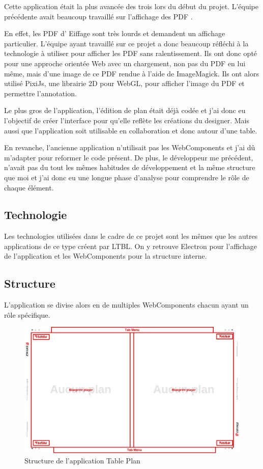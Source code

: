 Cette application était la plus avancée des trois lors du début du projet.
L'équipe précédente avait beaucoup travaillé sur l'affichage des PDF .

En effet, les PDF d’ Eiffage sont très lourds et demandent un affichage particulier.
L'équipe ayant travaillé sur ce projet a donc beaucoup réfléchi à la technologie à utiliser pour afficher les PDF sans ralentissement.
Ils ont donc opté pour une approche orientée Web avec un chargement, non pas du PDF en lui même, mais d'une image de ce PDF rendue à l'aide de ImageMagick.
Ils ont alors utilisé PixiJs, une librairie 2D pour WebGL, pour afficher l'image du PDF et permettre l'annotation.

Le plus gros de l'application, l'édition de plan était déjà codée et j'ai donc eu l'objectif de créer l'interface pour qu'elle reflète les créations du designer.
Mais aussi que l'application soit utilisable en collaboration et donc autour d'une table.

En revanche, l'ancienne application n'utilisait pas les WebComponents et j'ai dû m'adapter pour reformer le code présent.
De plus, le développeur me précédent, n'avait pas du tout les mêmes habitudes de développement et la même structure que moi et j'ai donc eu une longue phase d'analyse pour comprendre le rôle de chaque élément.

\subsection{Technologie}
\label{eiffageTablePlanTechnologie}

Les technologies utilisées dans le cadre de ce projet sont les mêmes que les autres applications de ce type créent par LTBL.
On y retrouve Electron pour l'affichage de l'application et les WebComponents pour la structure interne.

\subsection{Structure}
\label{eiffageTablePlanStructure}

L'application se divise alors en de multiples WebComponents chacun ayant un rôle spécifique.

\begin{figure}[h]
    \centering
    \includegraphics[scale=0.5]{img/table-plan-structure.pdf}
    \caption{Structure de l'application Table Plan}
\end{figure}

